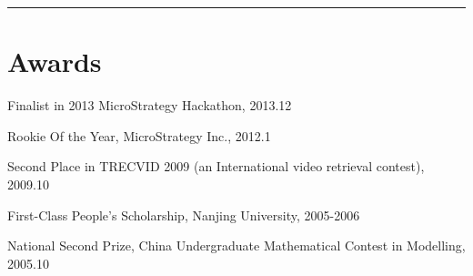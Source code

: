 \documentclass[letterpaper]{article}
\renewenvironment{itemize}{
  \begin{list}{}{
    \setlength{\leftmargin}{1.5em}
    \setlength{\itemsep}{0pt}
  }
}{
  \end{list}
}
\begin{document}
\rule{16.8cm}{0.1em}

\vspace{-1.5em}
\section*{Awards}
\begin{itemize}
\item Finalist in 2013 MicroStrategy Hackathon, 2013.12
\item Rookie Of the Year, MicroStrategy Inc., 2012.1
\item Second Place in TRECVID 2009 (an International video retrieval contest), 2009.10
\item First-Class People's Scholarship, Nanjing University, 2005-2006
\item National Second Prize, China Undergraduate Mathematical Contest in Modelling, 2005.10
\end{itemize}


\end{document}

